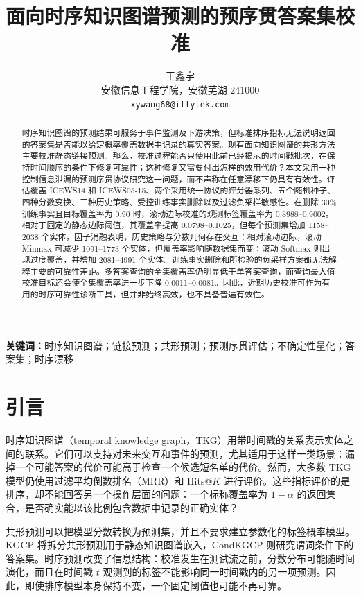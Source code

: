 \documentclass[UTF8,a4paper,11pt]{ctexart}
\title{面向时序知识图谱预测的预序贯答案集校准}
\author{王鑫宇\\安徽信息工程学院，安徽芜湖 241000\\\texttt{xywang68@iflytek.com}}
\date{}
\begin{document}
\maketitle

\begin{abstract}
时序知识图谱的预测结果可服务于事件监测及下游决策，但标准排序指标无法说明返回的答案集是否能以给定概率覆盖数据中记录的真实答案。现有面向知识图谱的共形方法主要校准静态链接预测。那么，校准过程能否只使用此前已经揭示的时间戳批次，在保持时间顺序的条件下修复可靠性；这种修复又需要付出怎样的效用代价？本文采用一种控制信息泄漏的预测序贯协议研究这一问题，而不声称在任意漂移下仍具有有效性。评估覆盖 ICEWS14 和 ICEWS05-15、两个采用统一协议的评分器系列、五个随机种子、四种分数变换、三种历史策略、受控训练事实删除以及过滤负采样敏感性。在删除 30\% 训练事实且目标覆盖率为 0.90 时，滚动边际校准的观测标签覆盖率为 0.8988--0.9002。相对于固定的静态边际阈值，其覆盖率提高 0.0798--0.1025，但每个预测集增加 1158--2038 个实体。因子消融表明，历史策略与分数几何存在交互：相对滚动边际，滚动 Minmax 可减少 1091--1773 个实体，但覆盖率影响随数据集而变；滚动 Softmax 则出现过度覆盖，并增加 2081--4991 个实体。训练事实删除和所检验的负采样方案都无法解释主要的可靠性差距。多答案查询的全集覆盖率仍明显低于单答案查询，而查询最大值校准目标还会使全集覆盖率进一步下降 0.0011--0.0081。因此，近期历史校准可作为有用的时序可靠性诊断工具，但并非始终高效，也不具备普遍有效性。
\end{abstract}

\noindent\textbf{关键词：}时序知识图谱；链接预测；共形预测；预测序贯评估；不确定性量化；答案集；时序漂移

\section{引言}

时序知识图谱（temporal knowledge graph，TKG）用带时间戳的关系表示实体之间的联系。它们可以支持对未来交互和事件的预测，尤其适用于这样一类场景：漏掉一个可能答案的代价可能高于检查一个候选短名单的代价。然而，大多数 TKG 模型仍使用过滤平均倒数排名（MRR）和 Hits@\(K\) 进行评价\cite{garciaduran2018sequence,li2021regcn,li2022tirgn,cai2023survey}。这些指标评价的是排序，却不能回答另一个操作层面的问题：一个标称覆盖率为 \(1-\alpha\) 的返回集合，是否确实能以该比例包含数据中记录的正确实体？

共形预测可以把模型分数转换为预测集，并且不要求建立参数化的标签概率模型\cite{vovk2005algorithmic,angelopoulos2023gentle}。KGCP 将拆分共形预测用于静态知识图谱嵌入，CondKGCP 则研究谓词条件下的答案集\cite{zhu2025kgcp,zhu2025condkgcp}。时序预测改变了信息结构：校准发生在测试流之前，分数分布可能随时间演化，而且在时间戳 \(t\) 观测到的标签不能影响同一时间戳内的另一项预测。因此，即使排序模型本身保持不变，一个固定阈值也可能不再可靠。
\end{document}
